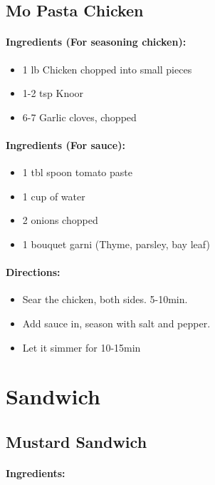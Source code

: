 \documentclass{article}
\begin{document}
\subsection{Mo Pasta Chicken}

\paragraph{Ingredients (For seasoning chicken):}
\begin{itemize}
	\item 1 lb Chicken chopped into small pieces
	\item 1-2 tsp Knoor
	\item 6-7 Garlic cloves, chopped
\end{itemize}

\paragraph{Ingredients (For sauce):}
\begin{itemize}
	\item 1 tbl spoon tomato paste
	\item 1 cup of water
	\item 2 onions chopped
	\item 1 bouquet garni (Thyme, parsley, bay leaf)
\end{itemize}

\paragraph{Directions:}
\begin{itemize}
	\item Sear the chicken, both sides. 5-10min.
	\item Add sauce in, season with salt and pepper.
	\item Let it simmer for 10-15min
\end{itemize}

\section{Sandwich}

\subsection{Mustard Sandwich}

\paragraph{Ingredients:}
\end{document}
